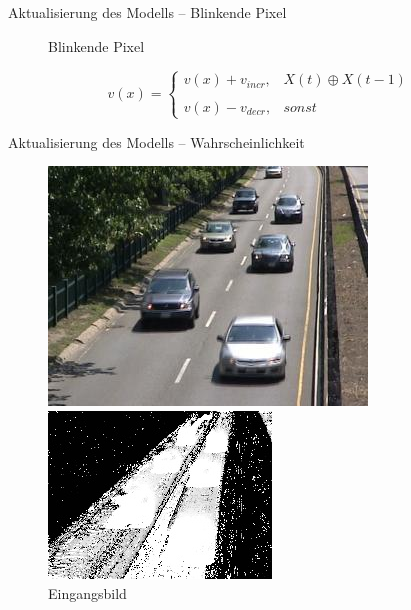 \documentclass[hyperref={pdfpagelabels=false}]{beamer}
\begin{document}
\begin{frame}[t]{Aktualisierung des Modells -- Blinkende Pixel}
\begin{figure}
\begin{minipage}{0.45\linewidth}
			\caption*{Blinkende Pixel}
		\end{minipage}
	\end{figure}
	\bigskip
	\begin{equation*}
		v(x)= 	\left\{
				\begin{array}{ll} 
					v(x) + v_{incr}, &  X(t) \oplus X(t-1) \\
					\\
					v(x) - v_{decr}, & sonst
				\end{array}
			\right .
	\end{equation*}
\end{frame}

\begin{frame}[t]{Aktualisierung des Modells -- Wahrscheinlichkeit}
	\vspace{1.65em}
	\begin{figure}
		\centering
		\begin{minipage}{0.45\linewidth}
			\includegraphics[width=1\linewidth]{Abbildungen/Eingang3.jpg}
			\caption*{Eingangsbild}
		\end{minipage}
		\begin{minipage}{0.45\linewidth}
			\includegraphics[width=1\linewidth]{Abbildungen/threshold.jpg}

\end{minipage}
\end{figure}
\end{frame}
\end{document}
